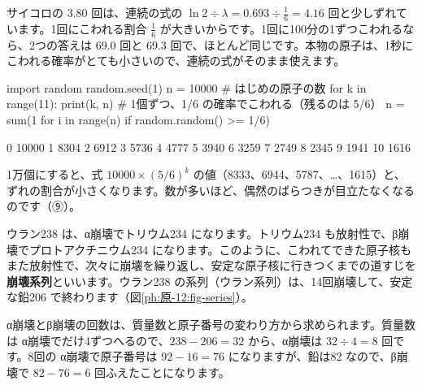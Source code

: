\noindent サイコロの $3.80$ 回は、連続の式の $\ln2\div\lambda=0.693\div\tfrac16=4.16$ 回と少しずれています。1回にこわれる割合 $\tfrac16$ が大きいからです。1回に100分の1ずつこわれるなら、2つの答えは 69.0 回と 69.3 回で、ほとんど同じです。本物の原子は、1秒にこわれる確率がとても小さいので、連続の式がそのまま使えます。

\begin{phcode}[Python]
import random
random.seed(1)
n = 10000              \# はじめの原子の数
for k in range(11):
    print(k, n)
    \# 1個ずつ、1/6 の確率でこわれる（残るのは 5/6）
    n = sum(1 for i in range(n) if random.random() >= 1/6)
\end{phcode}
\begin{phcodeout}[実行結果]
0 10000
1 8304
2 6912
3 5736
4 4777
5 3940
6 3259
7 2749
8 2345
9 1941
10 1616
\end{phcodeout}
1万個にすると、式 $10000\times(5/6)^k$ の値（8333、6944、5787、…、1615）と、ずれの割合が小さくなります。数が多いほど、偶然のばらつきが目立たなくなるのです（⑨）。

\begin{phmodel}[原子1個1個は、偶然にこわれる]
\end{phmodel}

\label{ph:原-12:sec6}
ウラン238 は、α崩壊でトリウム234 になります。トリウム234 も放射性で、β崩壊でプロトアクチニウム234 になります。このように、こわれてできた原子核もまた放射性で、次々に崩壊を繰り返し、安定な原子核に行きつくまでの道すじを\textbf{崩壊系列}といいます。ウラン238 の系列（ウラン系列）は、14回崩壊して、安定な鉛206 で終わります（図\ref{ph:原-12:fig-series}）。


\noindent α崩壊とβ崩壊の回数は、質量数と原子番号の変わり方から求められます。質量数は α崩壊でだけ4ずつへるので、$238-206=32$ から、α崩壊は $32\div4=8$ 回です。8回の α崩壊で原子番号は $92-16=76$ になりますが、鉛は82 なので、β崩壊で $82-76=6$ 回ふえたことになります。

